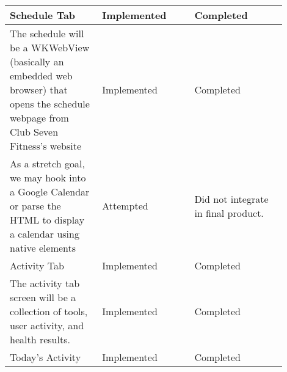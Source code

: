 \begin{center}
\begin{tabular}{ |p{0.3\linewidth}|p{0.3\linewidth}|p{0.3\linewidth}| }
 Schedule Tab & Implemented & Completed \\ \hline
 The schedule will be a WKWebView (basically an embedded web browser) that opens the schedule webpage from Club Seven Fitness's website & Implemented & Completed \\ \hline
 As a stretch goal, we may hook into a Google Calendar or parse the HTML to display a calendar using native elements & Attempted & Did not integrate in final product. \\ \hline
 Activity Tab & Implemented & Completed \\ \hline
 The activity tab screen will be a collection of tools, user activity, and health results. & Implemented & Completed \\ \hline
 Today’s Activity & Implemented & Completed \\ \hline
 
\end{tabular}
\newpage

\begin{tabular}{ |p{0.3\linewidth}|p{0.3\linewidth}|p{0.3\linewidth}| } 
 \hline
 

\end{tabular}
\end{center}
